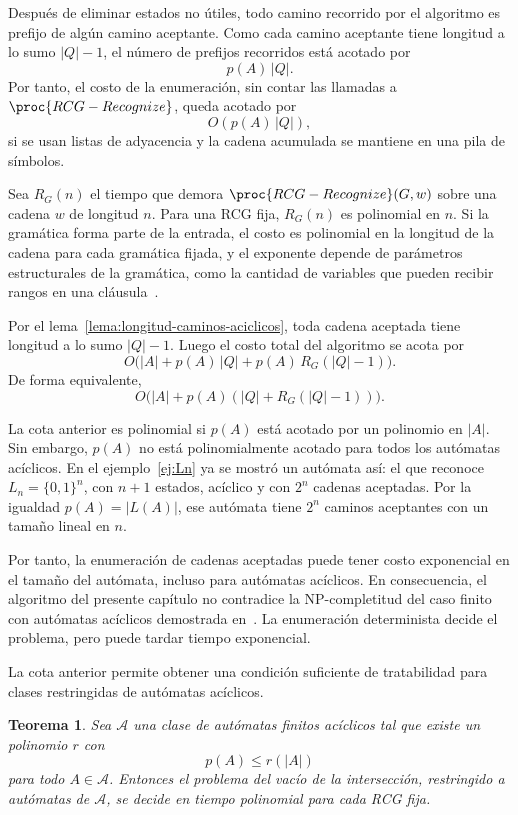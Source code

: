 \documentclass{report}
\theoremstyle{definition}
\theoremstyle{plain}
\newtheorem{teorema}{Teorema}[chapter]
\theoremstyle{remark}
\begin{document}
Después de eliminar estados no útiles, todo camino recorrido por el
algoritmo es prefijo de algún camino aceptante. Como cada camino
aceptante tiene longitud a lo sumo $|Q|-1$, el número de prefijos
recorridos está acotado por
\[
  p(A)\,|Q|.
\]
Por tanto, el costo de la enumeración, sin contar las llamadas a
$\proc{RCG-Recognize}$, queda acotado por
\[
  O(p(A)\,|Q|),
\]
si se usan listas de adyacencia y la cadena acumulada se mantiene en
una pila de símbolos.

Sea $R_G(n)$ el tiempo que demora
$\proc{RCG-Recognize}(G,w)$ sobre una cadena $w$ de longitud $n$. Para
una RCG fija, $R_G(n)$ es polinomial en $n$. Si la gramática forma parte
de la entrada, el costo es polinomial en la longitud de la cadena para
cada gramática fijada, y el exponente depende de parámetros
estructurales de la gramática, como la cantidad de variables que pueden
recibir rangos en una cláusula~\cite{bertsch2001rcg,kallmeyer2010parsing}.

Por el lema~\ref{lema:longitud-caminos-aciclicos}, toda cadena aceptada
tiene longitud a lo sumo $|Q|-1$. Luego el costo total del algoritmo se
acota por
\[
  O\bigl( |A| + p(A)\,|Q| + p(A)\,R_G(|Q|-1) \bigr).
\]
De forma equivalente,
\[
  O\bigl( |A| + p(A)(|Q| + R_G(|Q|-1)) \bigr).
\]

La cota anterior es polinomial si $p(A)$ está acotado por un polinomio
en $|A|$. Sin embargo, $p(A)$ no está polinomialmente acotado para todos
los autómatas acíclicos. En el ejemplo~\ref{ej:Ln} ya se mostró un
autómata así: el que reconoce $L_n=\{0,1\}^n$, con $n+1$ estados,
acíclico y con $2^n$ cadenas aceptadas. Por la igualdad $p(A)=|L(A)|$,
ese autómata tiene $2^n$ caminos aceptantes con un tamaño lineal en $n$.

Por tanto, la enumeración de cadenas aceptadas puede tener
costo exponencial en el tamaño del autómata, incluso para autómatas
acíclicos. En consecuencia, el algoritmo del presente
capítulo no contradice la NP-completitud del caso finito con autómatas
acíclicos demostrada en~\cite{bertsch2001rcg}. La enumeración
determinista decide el problema, pero puede tardar tiempo exponencial.

La cota anterior permite obtener una condición suficiente de
tratabilidad para clases restringidas de autómatas acíclicos.

\begin{teorema}
\label{teo:clases-pol-caminos}
Sea $\mathcal{A}$ una clase de autómatas finitos acíclicos tal que
existe un polinomio $r$ con
\[
  p(A) \le r(|A|)
\]
para todo $A \in \mathcal{A}$. Entonces el problema del vacío de la
intersección, restringido a autómatas de $\mathcal{A}$, se decide en
tiempo polinomial para cada RCG fija.
\end{teorema}
\end{document}
